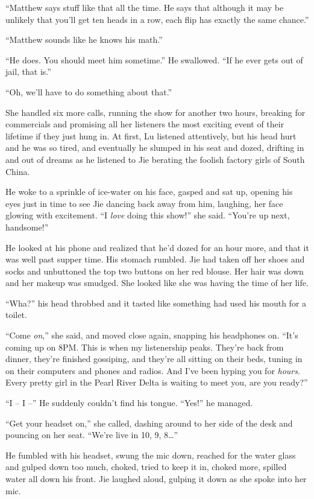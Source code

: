 ``Matthew says stuff like that all the time. He says that although
it may be unlikely that you'll get ten heads in a row, each flip
has exactly the same chance.''

``Matthew sounds like he knows his math.''

``He does. You should meet him sometime.'' He swallowed. ``If he ever
gets out of jail, that is.''

``Oh, we'll have to do something about that.''

She handled six more calls, running the show for another two hours,
breaking for commercials and promising all her listeners the most
exciting event of their lifetime if they just hung in. At first, Lu
listened attentively, but his head hurt and he was so tired, and
eventually he slumped in his seat and dozed, drifting in and out of
dreams as he listened to Jie berating the foolish factory girls of
South China.

He woke to a sprinkle of ice-water on his face, gasped and sat up,
opening his eyes just in time to see Jie dancing back away from
him, laughing, her face glowing with excitement. ``I \emph{love}
doing this show!'' she said. ``You're up next, handsome!''

He looked at his phone and realized that he'd dozed for an hour
more, and that it was well past supper time. His stomach rumbled.
Jie had taken off her shoes and socks and unbuttoned the top two
buttons on her red blouse. Her hair was down and her makeup was
smudged. She looked like she was having the time of her life.

``Wha?'' his head throbbed and it tasted like something had used his
mouth for a toilet.

``Come \emph{on},'' she said, and moved close again, snapping his
headphones on. ``It's coming up on 8PM. This is when my listenership
peaks. They're back from dinner, they're finished gossiping, and
they're all sitting on their beds, tuning in on their computers and
phones and radios. And I've been hyping you for \emph{hours}. Every
pretty girl in the Pearl River Delta is waiting to meet you, are
you ready?''

``I -- I --'' He suddenly couldn't find his tongue. ``Yes!'' he
managed.

``Get your headset on,'' she called, dashing around to her side of
the desk and pouncing on her seat. ``We're live in 10, 9, 8\ldots{}''

He fumbled with his headset, swung the mic down, reached for the
water glass and gulped down too much, choked, tried to keep it in,
choked more, spilled water all down his front. Jie laughed aloud,
gulping it down as she spoke into her mic.

